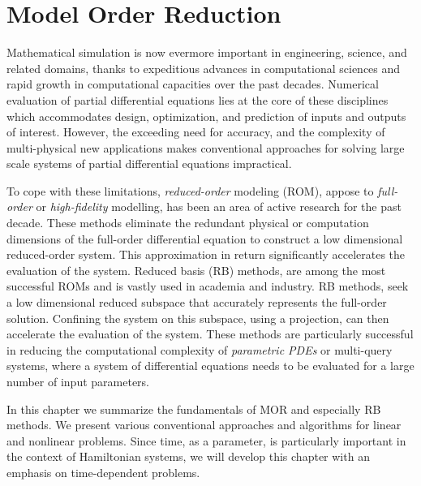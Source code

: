 \chapter{Model Order Reduction} \label{chapter:3}
Mathematical simulation is now evermore important in engineering, science, and related domains, thanks to expeditious advances in computational sciences and rapid growth in computational capacities over the past decades. Numerical evaluation of partial differential equations lies at the core of these disciplines which accommodates design, optimization, and prediction of inputs and outputs of interest. However, the exceeding need for accuracy, and the complexity of multi-physical new applications makes conventional approaches for solving large scale systems of partial differential equations impractical. 

To cope with these limitations, \emph{reduced-order} modeling (ROM), appose to \emph{full-order} or \emph{high-fidelity} modelling, has been an area of active research for the past decade. These methods eliminate the redundant physical or computation dimensions of the full-order differential equation to construct a low dimensional reduced-order system. This approximation in return significantly accelerates the evaluation of the system. Reduced basis (RB) methods, are among the most successful ROMs and is vastly used in academia and industry. RB methods, seek a low dimensional reduced subspace that accurately represents the full-order solution. Confining the system on this subspace, using a projection, can then accelerate the evaluation of the system. These methods are particularly successful in reducing the computational complexity of \emph{parametric PDEs} or multi-query systems, where a system of differential equations needs to be evaluated for a large number of input parameters.

In this chapter we summarize the fundamentals of MOR and especially RB methods. We present various conventional approaches and algorithms for linear and nonlinear problems. Since time, as a parameter, is particularly important in the context of Hamiltonian systems, we will develop this chapter with an emphasis on time-dependent problems.

